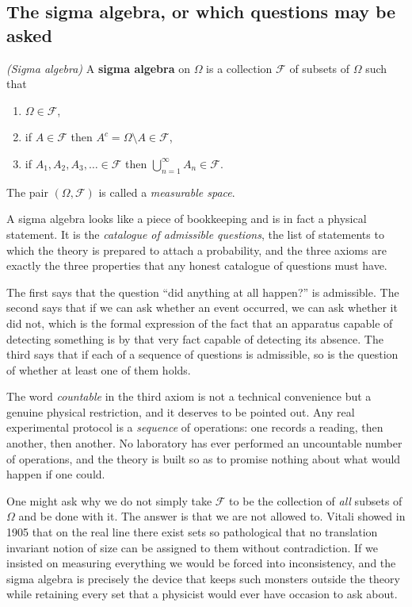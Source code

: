 	\subsection{The sigma algebra, or which questions may be asked}

		\begin{myDef}
			\textit{(Sigma algebra)} A \textbf{sigma algebra} on $\Omega$ is a collection
			$\mathcal{F}$ of subsets of $\Omega$ such that
			\begin{enumerate}
				\item $\Omega\in\mathcal{F}$,
				\item if $A\in\mathcal{F}$ then $A^{c} = \Omega\setminus A\in\mathcal{F}$,
				\item if $A_{1},A_{2},A_{3},\dots\in\mathcal{F}$ then
				$\bigcup_{n=1}^{\infty}A_{n}\in\mathcal{F}$.
			\end{enumerate}
			The pair $(\Omega,\mathcal{F})$ is called a \emph{measurable space}.
		\end{myDef}

		A sigma algebra looks like a piece of bookkeeping and is in fact a physical statement.
		It is the \emph{catalogue of admissible questions}, the list of statements to which
		the theory is prepared to attach a probability, and the three axioms are exactly the
		three properties that any honest catalogue of questions must have.

		The first says that the question ``did anything at all happen?'' is admissible. The
		second says that if we can ask whether an event occurred, we can ask whether it did not,
		which is the formal expression of the fact that an apparatus capable of detecting
		something is by that very fact capable of detecting its absence. The third says that if
		each of a sequence of questions is admissible, so is the question of whether at least
		one of them holds.

		The word \textit{countable} in the third axiom is not a technical convenience but a
		genuine physical restriction, and it deserves to be pointed out. Any real experimental
		protocol is a \textit{sequence} of operations: one records a reading, then another, then
		another. No laboratory has ever performed an uncountable number of operations, and the
		theory is built so as to promise nothing about what would happen if one could.

		One might ask why we do not simply take $\mathcal{F}$ to be the collection of
		\textit{all} subsets of $\Omega$ and be done with it. The answer is that we are not
		allowed to. Vitali showed in 1905 \citep{vitali1905problema} that on the real line there
		exist sets so pathological that no translation invariant notion of size can be assigned
		to them without contradiction. If we insisted on measuring everything we would be forced
		into inconsistency, and the sigma algebra is precisely the device that keeps such
		monsters outside the theory while retaining every set that a physicist would ever have
		occasion to ask about.

